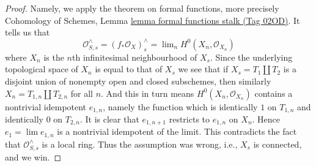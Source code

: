 \documentclass{amsart}
\theoremstyle{plain}
\theoremstyle{definition}
\theoremstyle{remark}
\numberwithin{equation}{subsection}
\def\lim{\mathop{\mathrm{lim}}\nolimits}
\begin{document}
\begin{proof}
\medskip\noindent
Namely, we apply the theorem on formal functions,
more precisely Cohomology of Schemes, Lemma
\href{https://stacks.math.columbia.edu/tag/02OD}{lemma formal functions stalk (Tag 02OD)}.
It tells us that
$$
\mathcal{O}^\wedge_{S, s} = (f_*\mathcal{O}_X)_s^\wedge =
\lim_n H^0(X_n, \mathcal{O}_{X_n})
$$
where $X_n$ is the $n$th infinitesimal neighbourhood of $X_s$.
Since the underlying topological space of $X_n$ is equal to that
of $X_s$ we see that if $X_s = T_1 \amalg T_2$ is a disjoint union
of nonempty open and closed subschemes, then similarly
$X_n = T_{1, n} \amalg T_{2, n}$ for all $n$. And this in turn means
$H^0(X_n, \mathcal{O}_{X_n})$ contains a nontrivial idempotent $e_{1, n}$,
namely the function which is identically $1$ on $T_{1, n}$ and
identically $0$ on $T_{2, n}$. It is clear that $e_{1, n + 1}$
restricts to $e_{1, n}$ on $X_n$. Hence $e_1 = \lim e_{1, n}$
is a nontrivial idempotent of the limit. This contradicts the fact
that $\mathcal{O}^\wedge_{S, s}$ is a local ring. Thus the
assumption was wrong, i.e., $X_s$ is connected, and we win.
\end{proof}
\end{document}
